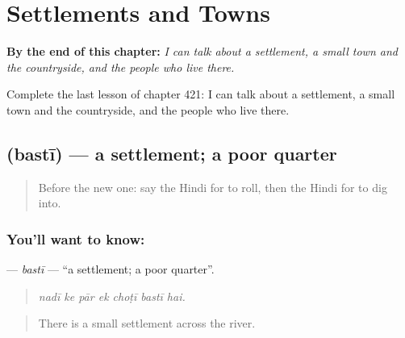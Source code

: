 
\chapter{Settlements and Towns}
\label{ch:hi-settlements-and-towns}

\begin{chapteropening}
\textbf{By the end of this chapter:} \emph{I can talk about a settlement, a small town and the countryside, and the people who live there.}

Complete the last lesson of chapter 421: I can talk about a settlement, a small town and the countryside, and the people who live there.
\end{chapteropening}

\section[\texorpdfstring{\hi{बस्ती} (bastī)}{बस्ती (bastī)}]{ (bastī) — a settlement; a poor quarter}

\label{lesson:HI-C421-basti}



\begin{quote}
Before the new one: say the Hindi for to roll, then the Hindi for to dig into.
\end{quote}

\subsection*{You'll want to know: }
\textbf{} — \emph{bastī} — \textquotedblleft{}a settlement; a poor quarter\textquotedblright{}.

\begin{quote}
      
\end{quote}

\begin{quote}
\emph{nadī ke pār ek choṭī bastī hai.}
\end{quote}

\begin{quote}
There is a small settlement across the river.
\end{quote}

